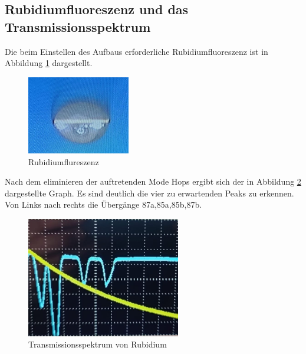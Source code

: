 \subsection{Rubidiumfluoreszenz und das Transmissionsspektrum}
Die beim Einstellen des Aufbaus erforderliche Rubidiumfluoreszenz ist in Abbildung \ref{fig:Fluoresenz} dargestellt.
\begin{figure}[h]
    \centering
    \includegraphics[width=0.4\textwidth]{abb/Fluresenz.jpeg}
    \caption{Rubidiumflureszenz}
    \label{fig:Fluoresenz}
\end{figure}
Nach dem eliminieren der auftretenden Mode Hops ergibt sich der in  Abbildung \ref{fig:graph} dargestellte Graph.
Es sind deutlich die vier zu erwartenden Peaks zu erkennen.
Von Links nach rechts die Übergänge 87a,85a,85b,87b.
\begin{figure}[h]
    \centering
    \includegraphics[width=0.6\textwidth]{abb/Graph.jpeg}
    \caption{Transmissionsspektrum von Rubidium}
    \label{fig:graph}
\end{figure}